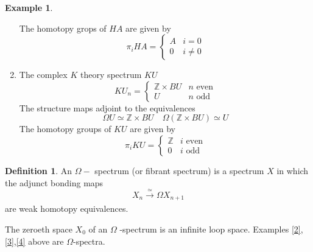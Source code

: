 \documentclass[notitlepage,12pt]{article}
\theoremstyle{definition}
\newtheorem{definition}[theorem]{Definition}
\newtheorem{example}[theorem]{Example}
\theoremstyle{para}{\normalfont}
\begin{document}
\begin{example}
\begin{enumerate}
    The homotopy grops of $HA$ are given by 
    \[
        \pi_i HA=\begin{cases}
            A&i=0\\
            0&i\neq 0
        \end{cases}
    \]  
    \item \label{4} The complex $K$ theory spectrum $KU$
    \[
        KU_n=\begin{cases}
            \mathbb{Z}\times BU&n \text{ even}\\
            U &n \text{ odd}
        \end{cases}
    \]The structure maps adjoint to the equivalences 
    \[
        \Omega U\simeq \mathbb{Z}\times BU \quad \Omega(\mathbb{Z}\times BU)\simeq U
    \] 
    The homotopy groups of $KU$ are given by 
    \[
        \pi_iKU=\begin{cases}
            \mathbb{Z}&i \text{ even}\\
            0& i \text{ odd}
        \end{cases}
    \]\end{enumerate}
\end{example}
\begin{definition}
    An $\Omega-$ spectrum (or fibrant spectrum) is a spectrum $X$ in which the adjunct bonding maps 
    \[
        X_n\xrightarrow[ ]{\simeq } \Omega X_{n+1 }
    \] are weak homotopy equivalences. 
\end{definition} The zeroeth space $X_0$ of an $\Omega$ -spectrum is an infinite loop space. 
Examples \ref{2},\ref{3},\ref{4} above are $\Omega$-spectra. 
\end{document}

